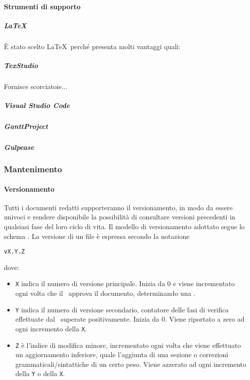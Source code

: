 			\paragraph{Strumenti di supporto}

			\subparagraph{\LaTeX} \label{LaTeX}
			È stato scelto \LaTeX \ perché presenta molti vantaggi quali:

			\subparagraph{TexStudio}
			Fornisce scorciatoie...

			\subparagraph{Visual Studio Code}


			\subparagraph{GanttProject}


			\subparagraph{Gulpease}



		\subsubsection{Mantenimento}

			\paragraph{Versionamento} \label{Versionamento}
			Tutti i documenti redatti supporteranno il versionamento, in modo da essere univoci e rendere disponibile la possibilità di consultare versioni precedenti
			in qualsiasi fase del loro ciclo di vita.
			Il modello di versionamento adottato segue lo schema . La versione di un file è espressa secondo la notazione
			\begin{center}
				\texttt{vX.Y.Z}
			\end{center}
			\indent dove:
			\begin{itemize}
				\item \texttt{X} indica il numero di versione principale. Inizia da 0 e viene incrementato ogni volta che il \Res\ approva il documento, determinando
					una .
				\item \texttt{Y} indica il numero di versione secondario, contatore delle fasi di verifica effettuate dal \Ver\ superate positivamente. Inizia da 0. Viene riportato a zero ad
					ogni incremento della \texttt{X}.
				\item \texttt{Z} è l'indice di modifica minore, incrementato ogni volta che viene effettuato un aggiornamento inferiore, quale l'aggiunta di una sezione
					o correzioni grammaticali/sintattiche di un certo peso. Viene azzerato ad ogni incremento della \texttt{Y} o della \texttt{X}.
			\end{itemize}

